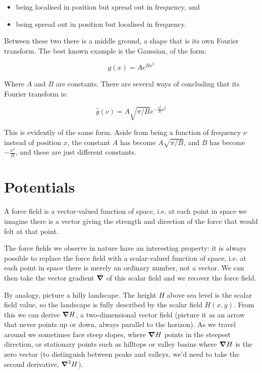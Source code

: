 \begin{itemize}
    \item being localised in position but spread out in frequency, and
    \item being spread out in position but localised in frequency.
\end{itemize}

Between these two there is a middle ground, a shape that is its own Fourier transform. The best known example is the Gaussian, of the form:

$$g(x) = Ae^{Bx^2}$$

Where $A$ and $B$ are constants. There are several ways of concluding that its Fourier transform is:

$$\hat{g}(\nu) = A \sqrt{\pi/B} e^{-\frac{\pi^2}{B} \nu^2}$$

This is evidently of the same form. Aside from being a function of frequency $\nu$ instead of position $x$, the constant $A$ has become $A \sqrt{\pi/B}$, and $B$ has become $-\frac{\pi^2}{B}$, and these are just different constants.

\section{Potentials} \label{sec:potential}

A force field is a vector-valued function of space, i.e. at each point in space we imagine there is a vector giving the strength and direction of the force that would felt at that point.

The force fields we observe in nature have an interesting property: it is always possible to replace the force field with a scalar-valued function of space, i.e. at each point in space there is merely an ordinary number, not a vector. We can then take the vector gradient $\grad$ of this scalar field and we recover the force field.

By analogy, picture a hilly landscape. The height $H$ above sea level is the scalar field value, so the landscape is fully described by the scalar field $H(x, y)$. From this we can derive $\grad H$, a two-dimensional vector field (picture it as an arrow that never points up or down, always parallel to the horizon). As we travel around we sometimes face steep slopes, where $\grad H$ points in the steepest direction, or stationary points such as hilltops or valley basins where $\grad H$ is the zero vector (to distinguish between peaks and valleys, we'd need to take the second derivative, $\grad^2H$).

